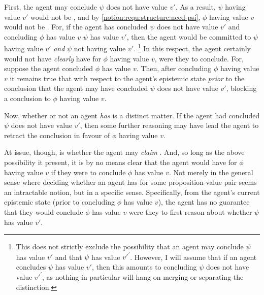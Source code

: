 \begin{note}
  First, the agent may conclude \(\psi\) does not have value \(v'\).
  As a result, \(\psi\) having value \(v'\) would not be \epVAd{}, and by \ref{notion:requ:structure:need-psi}, \(\phi\) having value \(v\) would not be \epVAd{}.
  For, if the agent has concluded \(\psi\) does not have value \(v'\) and concluding \(\phi\) has value \(v\)  \(\psi\) has value \(v'\), then the agent would be committed to \(\psi\) having value \(v'\) \emph{and} \(\psi\) not having value \(v'\).\nolinebreak
  \footnote{
    This does not strictly exclude the possibility that an agent may conclude \(\psi\) has value \(v'\) and that \(\psi\) has value \(v'^{'}\).
    However, I will assume that if an agent concludes \(\psi\) has value \(v'\), then this amounts to concluding \(\psi\) does not have value \(v'^{'}\), as nothing in particular will hang on merging or separating the distinction.
  }
  In this respect, the agent certainly would not have \emph{clearly} have \support{} for \(\phi\) having value \(v\), were they to conclude.
  For, suppose the agent concluded \(\phi\) has value \(v\).
  Then, after concluding \(\phi\) having value \(v\) it remains true that with respect to the agent's epistemic state \emph{prior} to the conclusion that the agent may have concluded \(\psi\) does not have value \(v'\), blocking a conclusion to \(\phi\) having value \(v\).

  Now, whether or not an agent \emph{has} \support{} is a distinct matter.
  If the agent had concluded \(\psi\) does not have value \(v'\), then some further reasoning may have lead the agent to retract the conclusion in favour of \(\phi\) having value \(v\).

  At issue, though, is whether the agent may \emph{claim} \support{}.
  And, so long as the above possibility it present, it is by no means clear that the agent would have \support{} for \(\phi\) having value \(v\) if they were to conclude \(\phi\) has value \(v\).
  Not merely in the general sense where deciding whether an agent has \support{} for some proposition-value pair seems an intractable notion, but in a specific sense.
  Specifically, from the agent's current epistemic state (prior to concluding \(\phi\) has value \(v\)), the agent has no guarantee that they would conclude \(\phi\) has value \(v\) were they to first reason about whether \(\psi\) has value \(v'\).
\end{note}

